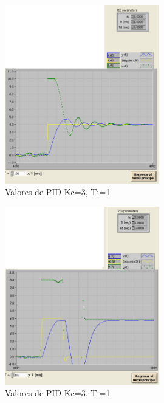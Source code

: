 \documentclass[]{article}
\begin{document}
\begin{figure}[h!]
	\centering
	\includegraphics[width=0.6\textwidth]{Imagenes/signalActividad1}
	\caption{Valores de PID Kc=3, Ti=1}
	\label{fig:signalActividad1}
\end{figure}

\begin{figure}[h!]
	\centering
	\includegraphics[width=0.6\textwidth]{Imagenes/signalActividad2}
	\caption{Valores de PID Kc=3, Ti=1}
	\label{fig:signalActividad2}
\end{figure}
\end{document}

